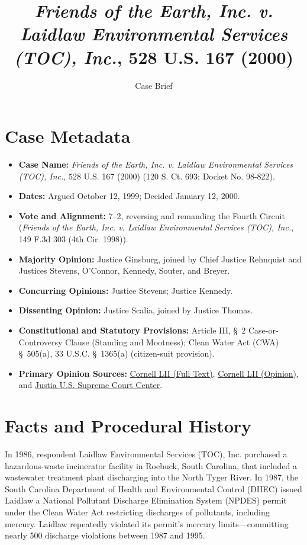 \documentclass[12pt]{article}
\title{\textit{Friends of the Earth, Inc. v. Laidlaw Environmental Services (TOC), Inc.}, 528 U.S. 167 (2000)}
\author{Case Brief}
\date{}
\begin{document}
\maketitle

\section{Case Metadata}
\begin{itemize}
  \item \textbf{Case Name:} \textit{Friends of the Earth, Inc. v. Laidlaw Environmental Services (TOC), Inc.}, 528 U.S. 167 (2000) (120 S. Ct. 693; Docket No. 98-822).
  \item \textbf{Dates:} Argued October 12, 1999; Decided January 12, 2000.
  \item \textbf{Vote and Alignment:} 7--2, reversing and remanding the Fourth Circuit (\textit{Friends of the Earth, Inc. v. Laidlaw Environmental Services (TOC), Inc.}, 149 F.3d 303 (4th Cir. 1998)).
  \item \textbf{Majority Opinion:} Justice Ginsburg, joined by Chief Justice Rehnquist and Justices Stevens, O'Connor, Kennedy, Souter, and Breyer.
  \item \textbf{Concurring Opinions:} Justice Stevens; Justice Kennedy.
  \item \textbf{Dissenting Opinion:} Justice Scalia, joined by Justice Thomas.
  \item \textbf{Constitutional and Statutory Provisions:} Article III, \S~2 Case-or-Controversy Clause (Standing and Mootness); Clean Water Act (CWA) \S~505(a), 33 U.S.C. \S~1365(a) (citizen-suit provision).
  \item \textbf{Primary Opinion Sources:} \href{https://www.law.cornell.edu/supremecourt/text/528/167}{Cornell LII (Full Text)}, \href{https://www.law.cornell.edu/supct/html/98-822.ZO.html}{Cornell LII (Opinion)}, and \href{https://supreme.justia.com/cases/federal/us/528/167/}{Justia U.S. Supreme Court Center}.
\end{itemize}

\section{Facts and Procedural History}
In 1986, respondent Laidlaw Environmental Services (TOC), Inc. purchased a hazardous-waste incinerator facility in Roebuck, South Carolina, that included a wastewater treatment plant discharging into the North Tyger River. In 1987, the South Carolina Department of Health and Environmental Control (DHEC) issued Laidlaw a National Pollutant Discharge Elimination System (NPDES) permit under the Clean Water Act restricting discharges of pollutants, including mercury. Laidlaw repeatedly violated its permit's mercury limits---committing nearly 500 discharge violations between 1987 and 1995.
\end{document}
